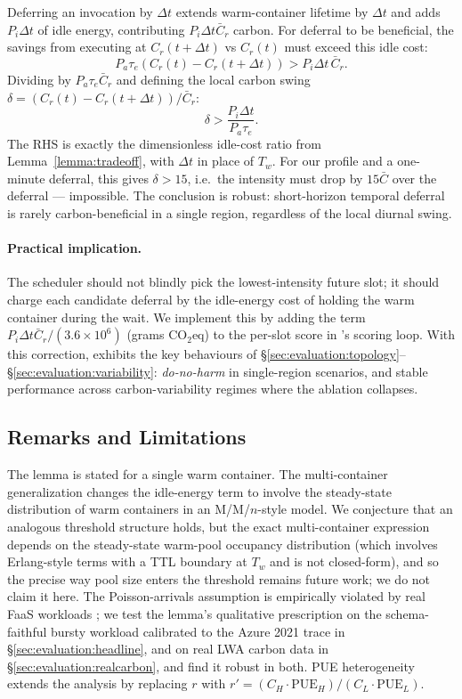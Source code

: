 Deferring an invocation by $\Delta t$ extends warm-container lifetime
by $\Delta t$ and adds $P_i \Delta t$ of idle energy, contributing
$P_i \Delta t \bar{C}_r$ carbon. For deferral to be beneficial, the
savings from executing at $C_r(t + \Delta t)$ vs $C_r(t)$ must exceed
this idle cost:
\begin{equation*}
P_a \tau_e (C_r(t) - C_r(t+\Delta t)) > P_i \Delta t\,\bar{C}_r.
\end{equation*}
Dividing by $P_a \tau_e \bar{C}_r$ and defining the local carbon
swing $\delta = (C_r(t) - C_r(t+\Delta t))/\bar{C}_r$:
\begin{equation*}
\delta > \frac{P_i \Delta t}{P_a \tau_e}.
\end{equation*}
The RHS is exactly the dimensionless idle-cost ratio from
Lemma~\ref{lemma:tradeoff}, with $\Delta t$ in place of $T_w$. For
our  profile and a one-minute deferral, this
gives $\delta > 15$, i.e.\ the intensity must drop by $15\bar{C}$
over the deferral --- impossible. The conclusion is robust:
short-horizon temporal deferral is rarely carbon-beneficial in a
single region, regardless of the local diurnal swing.

\paragraph{Practical implication.} The scheduler should not blindly
pick the lowest-intensity future slot; it should charge each candidate
deferral by the idle-energy cost of holding the warm container
during the wait. We implement this by adding the term
$P_i \Delta t \bar{C}_r / (3.6 \times 10^6)$ (grams CO$_2$eq) to the
per-slot score in \GreenFaaS's scoring loop. With this correction,
\GreenFaaS{} exhibits the key behaviours of
\S\ref{sec:evaluation:topology}--\S\ref{sec:evaluation:variability}:
\emph{do-no-harm} in single-region scenarios, and stable performance
across carbon-variability regimes where the ablation collapses.

\subsection{Remarks and Limitations}
\label{sec:tradeoff:remarks}

The lemma is stated for a single warm container. The multi-container
generalization changes the idle-energy term to involve the
steady-state distribution of warm containers in an M/M/$n$-style
model. We conjecture that an analogous threshold structure holds,
but the exact multi-container expression depends on the steady-state
warm-pool occupancy distribution (which involves Erlang-style terms
with a TTL boundary at $T_w$ and is not closed-form), and so the
precise way pool size enters the threshold remains future work; we do
not claim it here. The Poisson-arrivals assumption is empirically
violated by real FaaS workloads \citep{shahrad2020serverless}; we
test the lemma's qualitative prescription on the schema-faithful
bursty workload calibrated to the Azure 2021 trace in
\S\ref{sec:evaluation:headline}, and on real LWA carbon data in
\S\ref{sec:evaluation:realcarbon}, and find it robust in both. PUE
heterogeneity extends the analysis by replacing $r$ with
$r' = (C_H \cdot \mathrm{PUE}_H)/(C_L \cdot \mathrm{PUE}_L)$.
